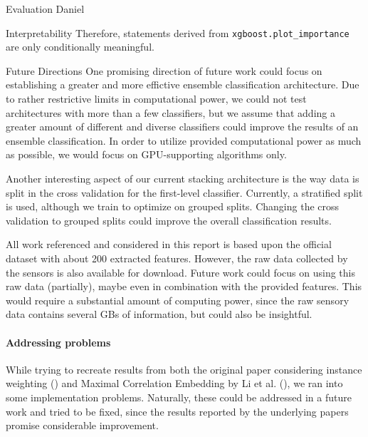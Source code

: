 \begin{section}{Evaluation Daniel}
\begin{subsection}{Interpretability}
    Therefore, statements derived from \texttt{xgboost.plot\_importance} are only conditionally meaningful.

\end{subsection}	
	
	\begin{subsection}{Future Directions}
		One promising direction of future work could focus on establishing a greater and more effictive ensemble classification architecture. Due to rather restrictive limits in computational power, we could not test architectures with more than a few classifiers, but we assume that adding a greater amount of different and diverse classifiers could improve the results of an ensemble classification. In order to utilize provided computational power as much as possible, we would focus on GPU-supporting algorithms only. \par
		Another interesting aspect of our current stacking architecture is the way data is split in the cross validation for the first-level classifier. Currently, a stratified split is used, although we train to optimize on grouped splits. Changing the cross validation to grouped splits could improve the overall classification results. \par
		All work referenced and considered in this report is based upon the official dataset with about 200 extracted features. However, the raw data collected by the sensors is also available for download. Future work could focus on using this raw data (partially), maybe even in combination with the provided features. This would require a substantial amount of computing power, since the raw sensory data contains several GBs of information, but could also be insightful.
		\paragraph{Addressing problems}
		While trying to recreate results from both the original paper considering instance weighting (\cite{Vaizman18}) and Maximal Correlation Embedding by Li et al. (\cite{Li19}), we ran into some implementation problems. Naturally, these could be addressed in a future work and tried to be fixed, since the results reported by the underlying papers promise considerable improvement.
	\end{subsection}
\end{section}
